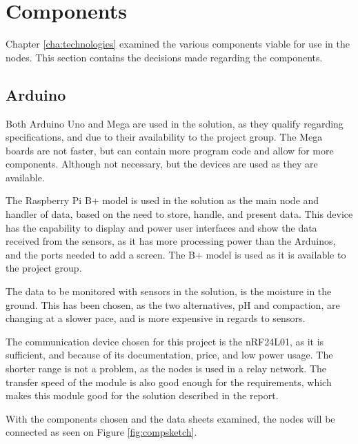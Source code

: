 \section{Components}
Chapter \ref{cha:technologies} examined the various components viable for use in the nodes. This section contains the decisions made regarding the components.

\subsection{Arduino}
Both Arduino Uno and Mega are used in the solution, as they qualify regarding specifications, and due to their availability to the project group. The Mega boards are not faster, but can contain more program code and allow for more components. Although not necessary, but the devices are used as they are available.

The Raspberry Pi B+ model is used in the solution as the main node and handler of data, based on the need to store, handle, and present data.  This device has the capability to display and power user interfaces and show the data received from the sensors, as it has more processing power than the Arduinos, and the ports needed to add a screen. The B+ model is used as it is available to the project group.

The data to be monitored with sensors in the solution, is the moisture in the ground. This has been chosen, as the two alternatives, pH and compaction, are changing at a slower pace, and is more expensive in regards to sensors.

The communication device chosen for this project is the nRF24L01, as it is sufficient, and because of its documentation, price, and low power usage. The shorter range is not a problem, as the nodes is used in a relay network. The transfer speed of the module is also good enough for the requirements, which makes this module good for the solution described in the report.

With the components chosen and the data sheets examined, the nodes will be connected as seen on Figure \ref{fig:compsketch}.

